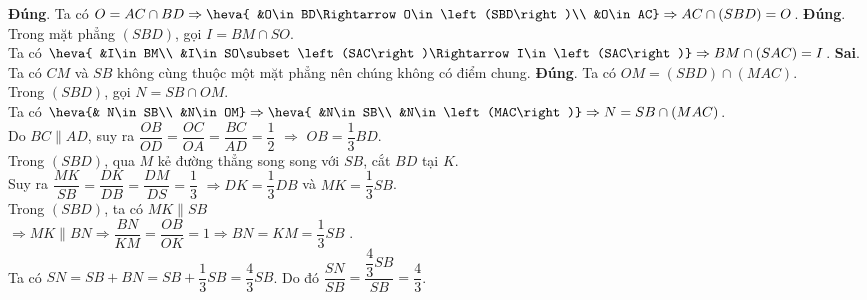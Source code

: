 \begin{ex}
{  \begin{itemchoice}
   \itemch \textbf{Đúng}. Ta có $O=AC\cap BD  \Rightarrow \heva{
    &O\in BD\Rightarrow O\in\left(SBD\right)\\
   &O\in  AC}
   \Rightarrow AC\cap\left(SBD\right)=O$. 
   \itemch \textbf{Đúng}. Trong mặt phẳng $\left(SBD\right)$,  gọi $I=BM\cap SO$.\\
    Ta có $\heva{
    &I\in BM\\
   &I\in SO\subset\left(SAC\right)\Rightarrow  I\in\left(SAC\right)}
   \Rightarrow BM\cap\left(SAC\right)=I$. 
    \itemch \textbf{Sai}. Ta có $CM$ và $SB$ không cùng thuộc một mặt phẳng nên chúng không có điểm chung.
   \itemch \textbf{Đúng}. Ta có $OM=\left(SBD\right)\cap\left(MAC\right)$.\\ 
   Trong $\left(SBD\right)$,  gọi $N=SB\cap OM$.\\
   Ta có  $\heva{&
   N\in SB\\ 
   &N\in OM} 
    \Rightarrow \heva{
   &N\in  SB\\
   &N\in\left(MAC\right)} 
    \Rightarrow N=SB\cap\left(MAC\right)$.\\
   Do $BC\parallel  AD$, suy ra $\dfrac{OB}{OD}=\dfrac{OC}{OA}=\dfrac{BC}{AD}=\dfrac{1}{2}$ $\Rightarrow $ $OB=\dfrac{1}{3}BD$. \\
   Trong $\left(SBD\right)$, qua $M$ kẻ đường thẳng song song với $SB$, cắt $BD$  tại $K$.\\
   Suy ra  $\dfrac{MK}{SB}=\dfrac{DK}{DB}=\dfrac{DM}{DS}=\dfrac{1}{3}$ $\Rightarrow DK=\dfrac{1}{3}DB$ và $MK=\dfrac{1}{3}SB$.\\
   Trong $\left(SBD\right)$, ta có $MK \parallel SB$\\ $\Rightarrow MK\parallel BN \Rightarrow\dfrac{BN}{KM}=\dfrac{OB}{OK}=1\Rightarrow BN=KM=\dfrac{1}{3}SB$ .\\ 
   Ta có  $SN=SB+BN=SB+\dfrac{1}{3}SB=\dfrac{4}{3}SB$. Do đó $\dfrac{SN}{SB}=\dfrac{\dfrac{4}{3}SB}{SB}=\dfrac{4}{3}$.
  \end{itemchoice}
 } 
\end{ex}

